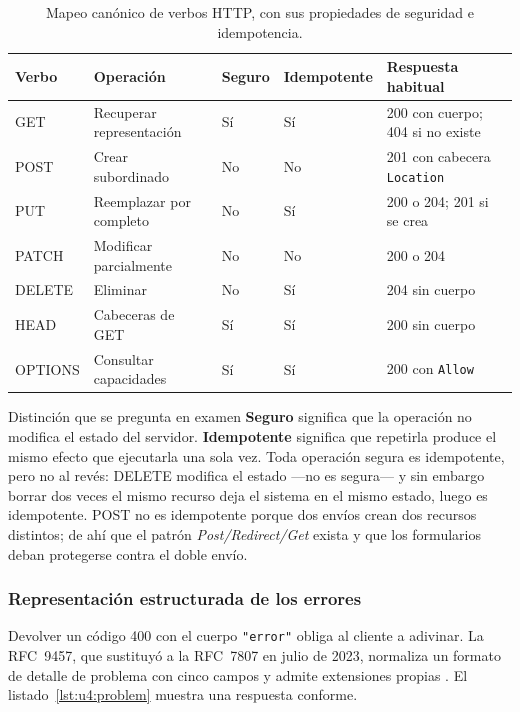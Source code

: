 \documentclass[11pt,a4paper,openany]{book}
\begin{document}
\begin{table}[htbp]
	\centering
	\caption{Mapeo canónico de verbos HTTP, con sus propiedades de seguridad e idempotencia.}
	\label{tab:u4:verbos}
	\scriptsize
	\begin{tabularx}{\textwidth}{L{1.4cm} L{3.1cm} C{1.3cm} C{2.0cm} X}
		\toprule
		\textbf{Verbo} & \textbf{Operación} & \textbf{Seguro} & \textbf{Idem\-potente} & \textbf{Respuesta habitual} \\
		\midrule
		GET & Recuperar representación & Sí & Sí & 200 con cuerpo; 404 si no existe \\
		POST & Crear subordinado & No & No & 201 con cabecera \texttt{Location} \\
		PUT & Reemplazar por completo & No & Sí & 200 o 204; 201 si se crea \\
		PATCH & Modificar parcialmente & No & No & 200 o 204 \\
		DELETE & Eliminar & No & Sí & 204 sin cuerpo \\
		HEAD & Cabeceras de GET & Sí & Sí & 200 sin cuerpo \\
		OPTIONS & Consultar capacidades & Sí & Sí & 200 con \texttt{Allow} \\
		\bottomrule
	\end{tabularx}
\end{table}

\begin{cajaadvertencia}{Distinción que se pregunta en examen}
	\textbf{Seguro} significa que la operación no modifica el estado del servidor. \textbf{Idempotente} significa que repetirla produce el mismo efecto que ejecutarla una sola vez. Toda operación segura es idempotente, pero no al revés: DELETE modifica el estado ---no es segura--- y sin embargo borrar dos veces el mismo recurso deja el sistema en el mismo estado, luego es idempotente. POST no es idempotente porque dos envíos crean dos recursos distintos; de ahí que el patrón \emph{Post/Redirect/Get} exista y que los formularios deban protegerse contra el doble envío.
\end{cajaadvertencia}

\subsubsection{Representación estructurada de los errores}

Devolver un código 400 con el cuerpo \texttt{"error"} obliga al cliente a adivinar. La RFC~9457, que sustituyó a la RFC~7807 en julio de 2023, normaliza un formato de detalle de problema con cinco campos y admite extensiones propias \cite{rfc9457}. El listado~\ref{lst:u4:problem} muestra una respuesta conforme.
\end{document}
